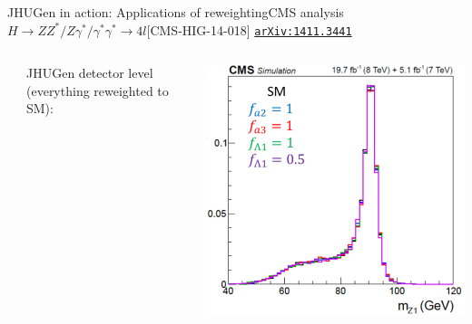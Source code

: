 \documentclass[usenames,dvipsnames,svgnames,table]{beamer}
\newcommand{\arxiv}[1]{\href{http://arxiv.org/abs/#1}{\nolinkurl{arXiv:#1}}}
\begin{document}
\begin{frame}{JHUGen in action: Applications of reweighting}{CMS analysis $H \to ZZ^*/Z\gamma^*/\gamma^*\gamma^* \to 4l$\hfill [CMS-HIG-14-018] \arxiv{1411.3441}}
\begin{columns}
\begin{column}{0.6\textwidth}
\begin{itemize}
\end{itemize}
\end{column}
\begin{column}{0.13\textwidth} \footnotesize
JHUGen detector level (everything reweighted to SM):
\end{column}
\begin{column}{0.27\textwidth}
\includegraphics[width=\textwidth]{HVV/reweighted}
\end{column}
\end{columns}
\end{frame}
\end{document}
